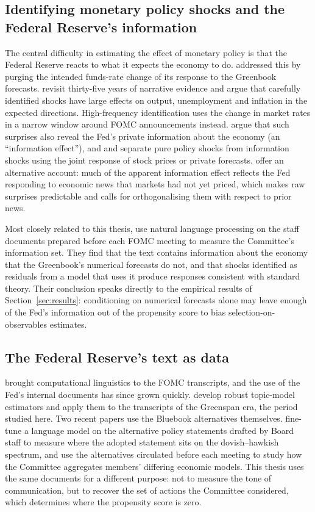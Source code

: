 \subsection{Identifying monetary policy shocks and the Federal Reserve's information}

The central difficulty in estimating the effect of monetary policy is that the Federal Reserve reacts to what it
expects the economy to do. \citet{romer2004} addressed this by purging the intended funds-rate change of its
response to the Greenbook forecasts. \citet{romer2023} revisit thirty-five years of narrative evidence and argue
that carefully identified shocks have large effects on output, unemployment and inflation in the expected
directions. High-frequency identification uses the change in market rates in a narrow window around FOMC
announcements instead. \citet{nakamura2018} argue that such surprises also reveal the Fed's private information
about the economy (an ``information effect''), and \citet{jarocinski2020} and \citet{mirandaagrippino2021}
separate pure policy shocks from information shocks using the joint response of stock prices or private forecasts.
\citet{bauer2023aer,bauer2023nber} offer an alternative account: much of the apparent information effect reflects
the Fed responding to economic news that markets had not yet priced, which makes raw surprises predictable and
calls for orthogonalising them with respect to prior news.

Most closely related to this thesis, \citet{aruoba2025} use natural language processing on the staff documents
prepared before each FOMC meeting to measure the Committee's information set. They find that the text contains
information about the economy that the Greenbook's numerical forecasts do not, and that shocks identified as
residuals from a model that uses it produce responses consistent with standard theory. Their conclusion speaks
directly to the empirical results of Section~\ref{sec:results}: conditioning on numerical forecasts alone may leave
enough of the Fed's information out of the propensity score to bias selection-on-observables estimates.

\subsection{The Federal Reserve's text as data}

\citet{hansen2018} brought computational linguistics to the FOMC transcripts, and the use of the Fed's internal
documents has since grown quickly. \citet{ke2022} develop robust topic-model estimators and apply them to the
transcripts of the Greenspan era, the period studied here. Two recent papers use the Bluebook alternatives
themselves. \citet{doh2026} fine-tune a language model on the alternative policy statements drafted by Board staff
to measure where the adopted statement sits on the dovish--hawkish spectrum, and \citet{laarits2025} use the
alternatives circulated before each meeting to study how the Committee aggregates members' differing economic
models. This thesis uses the same documents for a different purpose: not to measure the tone of communication, but
to recover the set of actions the Committee considered, which determines where the propensity score is zero.

